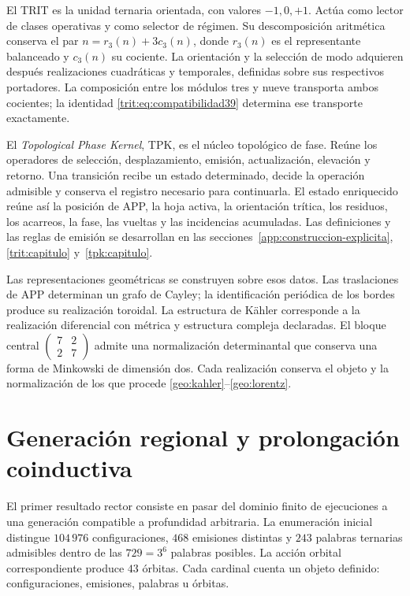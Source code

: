 El TRIT es la unidad ternaria orientada, con valores \(-1,0,+1\).
Actúa como lector de clases operativas y como selector de régimen. Su
descomposición aritmética conserva el par
\(n=r_3(n)+3c_3(n)\), donde \(r_3(n)\) es el representante balanceado
y \(c_3(n)\) su cociente. La orientación y la selección de modo adquieren
después realizaciones cuadráticas y temporales, definidas sobre sus
respectivos portadores. La composición entre los módulos tres y nueve
transporta ambos cocientes; la identidad
\eqref{trit:eq:compatibilidad39} determina ese transporte exactamente.

El \emph{Topological Phase Kernel}, TPK, es el núcleo topológico de fase.
Reúne los operadores de selección, desplazamiento, emisión, actualización,
elevación y retorno. Una transición recibe un estado determinado, decide
la operación admisible y conserva el registro necesario para continuarla.
El estado enriquecido reúne así la posición de APP, la hoja activa, la
orientación trítica, los residuos, los acarreos, la fase, las vueltas y
las incidencias acumuladas. Las definiciones y las reglas de emisión se
desarrollan en las secciones~\ref{app:construccion-explicita}, \ref{trit:capitulo}
y~\ref{tpk:capitulo}.

Las representaciones geométricas se construyen sobre esos datos. Las
traslaciones de APP determinan un grafo de Cayley; la identificación
periódica de los bordes produce su realización toroidal. La estructura
de Kähler corresponde a la realización diferencial con métrica y
estructura compleja declaradas. El bloque central
\(\left(\begin{smallmatrix}7&2\\2&7\end{smallmatrix}\right)\)
admite una normalización determinantal que conserva una forma de
Minkowski de dimensión dos. Cada realización conserva el objeto y la
normalización de los que procede
\ref{geo:kahler}--\ref{geo:lorentz}.

\section*{Generación regional y prolongación coinductiva}

El primer resultado rector consiste en pasar del dominio finito de
ejecuciones a una generación compatible a profundidad arbitraria. La
enumeración inicial distingue \(104\,976\) configuraciones, \(468\)
emisiones distintas y \(243\) palabras ternarias admisibles dentro de
las \(729=3^6\) palabras posibles. La acción orbital correspondiente
produce \(43\) órbitas. Cada cardinal cuenta un objeto definido:
configuraciones, emisiones, palabras u órbitas.


